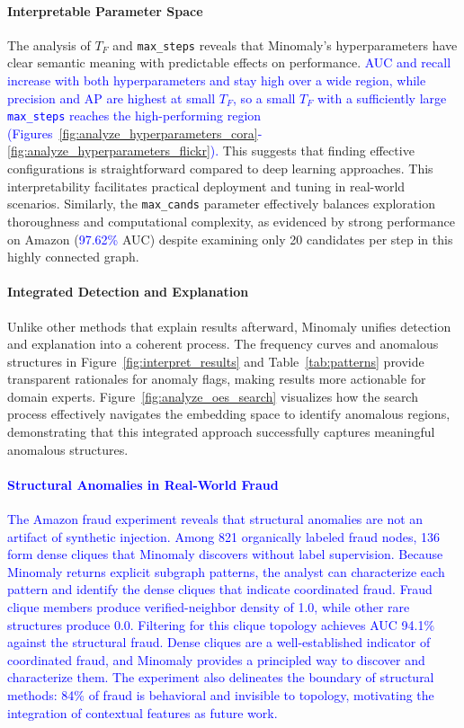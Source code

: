 \documentclass[preprint,12pt]{elsarticle}
\newcommand{\new}[1]{\textcolor{blue}{#1}}
\theoremstyle{plain}
\theoremstyle{definition}
\theoremstyle{remark}
\begin{document}
\paragraph{Interpretable Parameter Space}
The analysis of $T_F$ and \texttt{max\_steps} reveals that Minomaly's hyperparameters have clear semantic meaning with predictable effects on performance. \new{AUC and recall increase with both hyperparameters and stay high over a wide region, while precision and AP are highest at small $T_F$, so a small $T_F$ with a sufficiently large \texttt{max\_steps} reaches the high-performing region (Figures~\ref{fig:analyze_hyperparameters_cora}-\ref{fig:analyze_hyperparameters_flickr}).} This suggests that finding effective configurations is straightforward compared to deep learning approaches. This interpretability facilitates practical deployment and tuning in real-world scenarios. Similarly, the \texttt{max\_cands} parameter effectively balances exploration thoroughness and computational complexity, as evidenced by strong performance on Amazon (\new{97.62\%} AUC) despite examining only 20 candidates per step in this highly connected graph.

\paragraph{Integrated Detection and Explanation} Unlike other methods that explain results afterward, Minomaly unifies detection and explanation into a coherent process. The frequency curves and anomalous structures in Figure~\ref{fig:interpret_results} and Table~\ref{tab:patterns} provide transparent rationales for anomaly flags, making results more actionable for domain experts. Figure~\ref{fig:analyze_oes_search} visualizes how the search process effectively navigates the embedding space to identify anomalous regions, demonstrating that this integrated approach successfully captures meaningful anomalous structures.

\paragraph{\new{Structural Anomalies in Real-World Fraud}}
\new{The Amazon fraud experiment reveals that structural anomalies are not an artifact of synthetic injection. Among 821 organically labeled fraud nodes, 136 form dense cliques that Minomaly discovers without label supervision. Because Minomaly returns explicit subgraph patterns, the analyst can characterize each pattern and identify the dense cliques that indicate coordinated fraud. Fraud clique members produce verified-neighbor density of 1.0, while other rare structures produce 0.0. Filtering for this clique topology achieves AUC 94.1\% against the structural fraud. Dense cliques are a well-established indicator of coordinated fraud, and Minomaly provides a principled way to discover and characterize them. The experiment also delineates the boundary of structural methods: 84\% of fraud is behavioral and invisible to topology, motivating the integration of contextual features as future work.}
\end{document}
